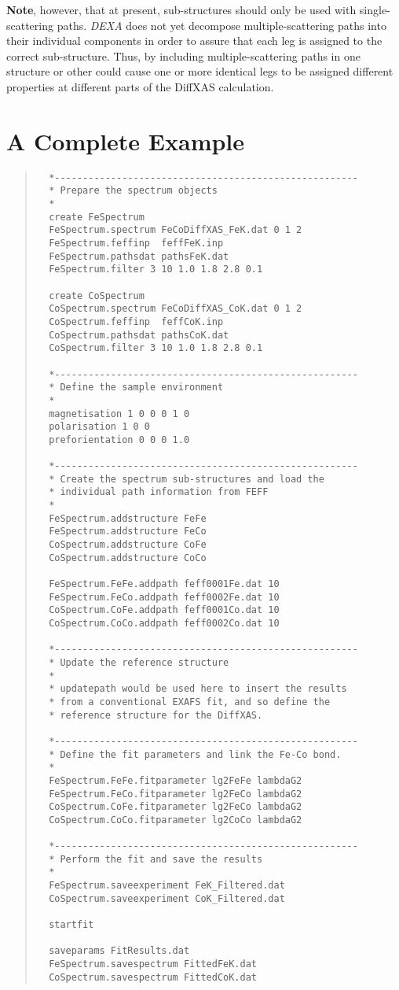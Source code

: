 \documentclass[a4paper,12pt]{report}
\newcommand{\dexa}{\emph{DEXA} }
\begin{document}
{\bf Note}, however, that at present, sub-structures should only be used with single-scattering paths. \dexa does not yet decompose multiple-scattering paths into their individual components in order to assure that each leg is assigned to the correct sub-structure. Thus, by including multiple-scattering paths in one structure or other could cause one or more identical legs to be assigned different properties at different parts of the DiffXAS calculation.



\section{A Complete Example}
\begin{quote}
  \begin{verbatim}
  *------------------------------------------------------
  * Prepare the spectrum objects
  *
  create FeSpectrum
  FeSpectrum.spectrum FeCoDiffXAS_FeK.dat 0 1 2
  FeSpectrum.feffinp  feffFeK.inp
  FeSpectrum.pathsdat pathsFeK.dat
  FeSpectrum.filter 3 10 1.0 1.8 2.8 0.1

  create CoSpectrum  
  CoSpectrum.spectrum FeCoDiffXAS_CoK.dat 0 1 2
  CoSpectrum.feffinp  feffCoK.inp
  CoSpectrum.pathsdat pathsCoK.dat
  CoSpectrum.filter 3 10 1.0 1.8 2.8 0.1
  
  *------------------------------------------------------
  * Define the sample environment
  *
  magnetisation 1 0 0 0 1 0
  polarisation 1 0 0
  preforientation 0 0 0 1.0

  *------------------------------------------------------
  * Create the spectrum sub-structures and load the
  * individual path information from FEFF
  *
  FeSpectrum.addstructure FeFe  
  FeSpectrum.addstructure FeCo
  CoSpectrum.addstructure CoFe
  CoSpectrum.addstructure CoCo  
  
  FeSpectrum.FeFe.addpath feff0001Fe.dat 10
  FeSpectrum.FeCo.addpath feff0002Fe.dat 10
  CoSpectrum.CoFe.addpath feff0001Co.dat 10
  CoSpectrum.CoCo.addpath feff0002Co.dat 10
  
  *------------------------------------------------------
  * Update the reference structure
  *
  * updatepath would be used here to insert the results 
  * from a conventional EXAFS fit, and so define the 
  * reference structure for the DiffXAS.
  
  *------------------------------------------------------
  * Define the fit parameters and link the Fe-Co bond.
  *  
  FeSpectrum.FeFe.fitparameter lg2FeFe lambdaG2
  FeSpectrum.FeCo.fitparameter lg2FeCo lambdaG2
  CoSpectrum.CoFe.fitparameter lg2FeCo lambdaG2
  CoSpectrum.CoCo.fitparameter lg2CoCo lambdaG2

  *------------------------------------------------------
  * Perform the fit and save the results
  *
  FeSpectrum.saveexperiment FeK_Filtered.dat
  CoSpectrum.saveexperiment CoK_Filtered.dat

  startfit

  saveparams FitResults.dat  
  FeSpectrum.savespectrum FittedFeK.dat
  CoSpectrum.savespectrum FittedCoK.dat

  \end{verbatim}
\end{quote}
\end{document}

